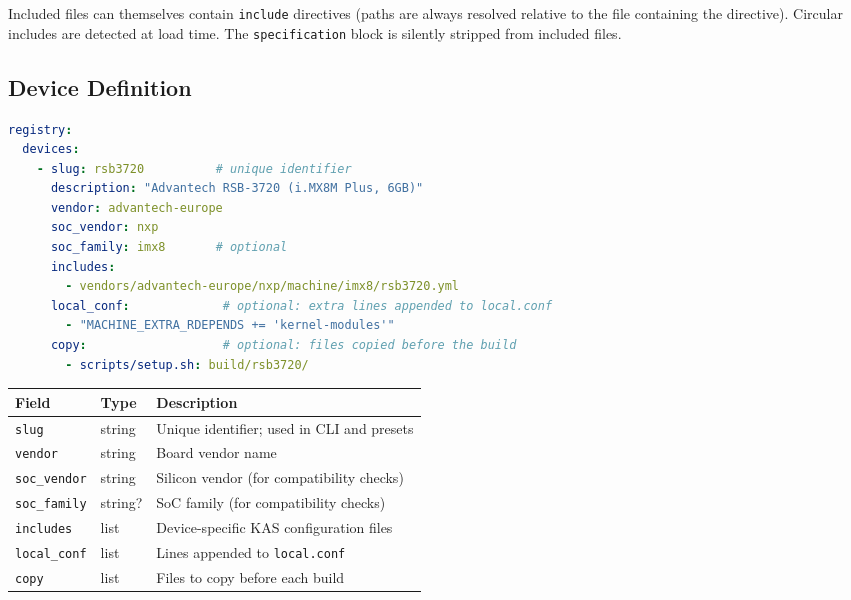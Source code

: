 \documentclass[a4paper,11pt]{article}
\begin{document}
\begin{notebox}
  Included files can themselves contain \texttt{include} directives
  (paths are always resolved relative to the file containing the directive).
  Circular includes are detected at load time.
  The \texttt{specification} block is silently stripped from included files.
\end{notebox}

\subsection{Device Definition}

\begin{lstlisting}[language=YAML]
registry:
  devices:
    - slug: rsb3720          # unique identifier
      description: "Advantech RSB-3720 (i.MX8M Plus, 6GB)"
      vendor: advantech-europe
      soc_vendor: nxp
      soc_family: imx8       # optional
      includes:
        - vendors/advantech-europe/nxp/machine/imx8/rsb3720.yml
      local_conf:             # optional: extra lines appended to local.conf
        - "MACHINE_EXTRA_RDEPENDS += 'kernel-modules'"
      copy:                   # optional: files copied before the build
        - scripts/setup.sh: build/rsb3720/
\end{lstlisting}

\begin{tabularx}{\linewidth}{L{28mm}L{18mm}X}
  \textbf{Field} & \textbf{Type} & \textbf{Description} \\
  \toprule
   \texttt{slug}        & string   & Unique identifier; used in CLI and presets \\
    \texttt{vendor}      & string   & Board vendor name \\
   \texttt{soc\_vendor} & string   & Silicon vendor (for compatibility checks) \\
    \texttt{soc\_family} & string?  & SoC family (for compatibility checks) \\
   \texttt{includes}    & list     & Device-specific KAS configuration files \\
    \texttt{local\_conf} & list     & Lines appended to \texttt{local.conf} \\
   \texttt{copy}        & list     & Files to copy before each build \\
  \bottomrule
\end{tabularx}
\end{document}
